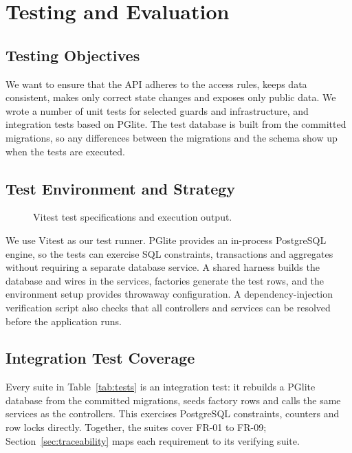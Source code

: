 \chapter{Testing and Evaluation}
\label{ch:testing}

\section{Testing Objectives}
\label{sec:testing-objectives}
We want to ensure that the API adheres to the access rules, keeps data consistent, makes only correct state changes and exposes only public data. We wrote a number of unit tests for selected guards and infrastructure, and integration tests based on PGlite. The test database is built from the committed migrations, so any differences between the migrations and the schema show up when the tests are executed.

\section{Test Environment and Strategy}

\begin{figure}[H]
    \centering
    \caption{Vitest test specifications and execution output.}
    \label{fig:testing}
\end{figure}

We use Vitest as our test runner. PGlite provides an in-process PostgreSQL engine, so the tests can exercise SQL constraints, transactions and aggregates without requiring a separate database service. A shared harness builds the database and wires in the services, factories generate the test rows, and the environment setup provides throwaway configuration. A dependency-injection verification script also checks that all controllers and services can be resolved before the application runs. 

\section{Integration Test Coverage}
Every suite in Table~\ref{tab:tests} is an integration test: it rebuilds a PGlite database from the committed migrations, seeds factory rows and calls the same services as the controllers. This exercises PostgreSQL constraints, counters and row locks directly. Together, the suites cover FR-01 to FR-09; Section~\ref{sec:traceability} maps each requirement to its verifying suite.

